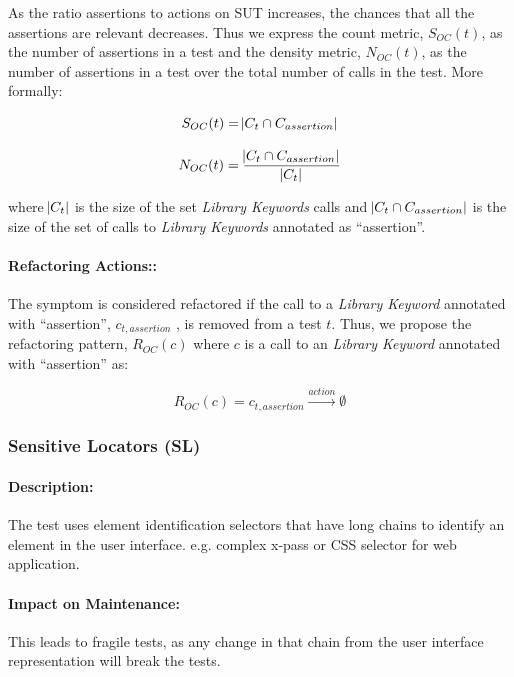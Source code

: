 As the ratio assertions to actions on SUT increases, the chances that all the assertions are relevant decreases. Thus we express the count metric, $S_{OC}(t)$, as the number of assertions in a test and the density metric, $N_{OC}(t)$, as the number of assertions in a test over the total number of calls in the test. More formally:

\begin{equation*}
    S_{OC}(t) = \abs{C_{t} \cap C_{assertion}}
\end{equation*}

\begin{equation*}
    N_{OC}(t) = \frac{ \abs{C_{t} \cap C_{assertion}}}{\abs{C_{t}}}
\end{equation*}

where $\abs{C_{t}}$ is the size of the set \emph{Library Keywords} calls and $\abs{C_{t} \cap C_{assertion}}$ is the size of the set of calls to \emph{Library Keywords} annotated as ``assertion''.

\paragraph{Refactoring Actions::}

The symptom is considered refactored if the call to a \emph{Library Keyword} annotated with ``assertion'', $c_{t, assertion}$ , is removed from a test $t$. Thus, we propose the refactoring pattern, $R_{OC}(c)$ where $c$ is a call to an \emph{Library Keyword} annotated with ``assertion'' as:

\begin{equation*}
    R_{OC}(c) = c_{t, assertion} \xrightarrow{action} \emptyset
\end{equation*}

\subsubsection{Sensitive Locators (SL)}

\paragraph{Description:}

The test uses element identification selectors that have long chains to identify an element in the user interface. e.g. complex x-pass or CSS selector for web application.

\paragraph{Impact on Maintenance:} This leads to fragile tests, as any change in that chain from the user interface representation will break the tests.

